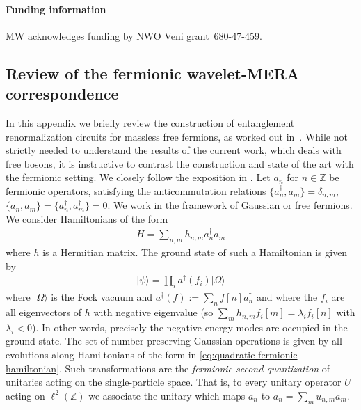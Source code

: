 \documentclass[submission, Phys]{SciPost}
\theoremstyle{definition}
\theoremstyle{remark}
\newcommand{\ket}[1]{\lvert#1\rangle}
\newcommand{\ZZ}{\mathbb Z}
\newcommand{\change}[1]{#1}
\begin{document}
\paragraph{Funding information}
MW acknowledges funding by NWO Veni grant~680-47-459.

\begin{appendix}
\change{
\section{Review of the fermionic wavelet-MERA correspondence}\label{sec:review fermions}
In this appendix we briefly review the construction of entanglement renormalization circuits for massless free fermions, as worked out in~\cite{evenbly2016entanglement,haegeman2018rigorous,witteveen2019quantum}.
While not strictly needed to understand the results of the current work, which deals with free bosons, it is instructive to contrast the construction and state of the art with the fermionic setting.
We closely follow the exposition in \cite{haegeman2018rigorous}.
Let $a_n$ for $n \in \ZZ$ be fermionic operators, satisfying the anticommutation relations $\{a^\dagger_n, a_m\} = \delta_{n,m}$, $\{a_n, a_m\} = \{a^\dagger_n, a^\dagger_m\} = 0$.
We work in the framework of Gaussian or free fermions.
We consider Hamiltonians of the form
\begin{align}\label{eq:quadratic fermionic hamiltonian}
  H = \sum_{n,m} h_{n,m} a^\dagger_n a_m
\end{align}
where $h$ is a Hermitian matrix.
The ground state of such a Hamiltonian is given by
\begin{align*}
  \ket{\psi} = \prod_i a^\dagger(f_i) \ket{\Omega}
\end{align*}
where $\ket{\Omega}$ is the Fock vacuum and $a^\dagger(f) := \sum_n f[n] a^\dagger_n$ and where the $f_i$ are all eigenvectors of $h$ with negative eigenvalue (so $\sum_m h_{n,m} f_i[m] = \lambda_i f_i[n]$ with $\lambda_i < 0$).
In other words, precisely the negative energy modes are occupied in the ground state.
The set of number-preserving Gaussian operations is given by all evolutions along Hamiltonians of the form in \cref{eq:quadratic fermionic hamiltonian}.
Such transformations are the \emph{fermionic second quantization} of unitaries acting on the single-particle space. That is, to every unitary operator $U$ acting on $\ell^2(\ZZ)$ we associate the unitary which maps $a_n$ to $\tilde{a}_n = \sum_{m} u_{n,m} a_m$.

}
\end{appendix}
\end{document}
